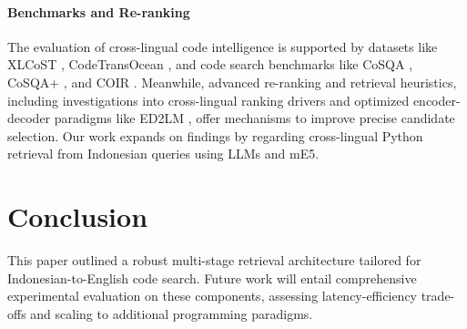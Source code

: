 \documentclass[11pt]{article}
\begin{document}
\paragraph{Benchmarks and Re-ranking}
The evaluation of cross-lingual code intelligence is supported by datasets like XLCoST \cite{xlcost2022}, CodeTransOcean \cite{codetrans2023}, and code search benchmarks like CoSQA \cite{cosqa2021}, CoSQA+ \cite{cosqaplus2024}, and COIR \cite{coir2025}. Meanwhile, advanced re-ranking and retrieval heuristics, including investigations into cross-lingual ranking drivers \cite{whatdrives2025} and optimized encoder-decoder paradigms like ED2LM \cite{ed2lm2022}, offer mechanisms to improve precise candidate selection. Our work expands on findings by \citet{azhary2025} regarding cross-lingual Python retrieval from Indonesian queries using LLMs and mE5.

\section{Conclusion}
This paper outlined a robust multi-stage retrieval architecture tailored for Indonesian-to-English code search. Future work will entail comprehensive experimental evaluation on these components, assessing latency-efficiency trade-offs and scaling to additional programming paradigms.



\end{document}
